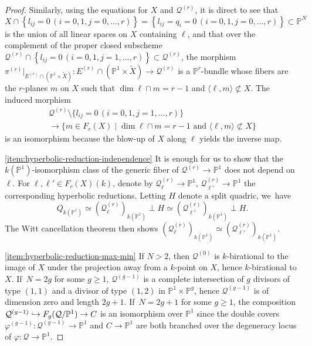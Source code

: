 \documentclass[JEP,XML,SOM,Unicode,NoEqCountersInSection,published]{cedram}
\newcommand\hto{\mathrel{\lhook\joinrel\to}}
\theoremstyle{plain}
\theoremstyle{definition}
\let\phi\varphi
\renewcommand\P{\mathbb{P}}
\begin{document}
\begin{proof}
Similarly, using the equations for $X$ and $\mathcal{Q}^{(r)}$,
it is direct to see that
\[
X\cap \left\{l_{ij}=0\, (i=0,1, j=0,\dots, r)\right\}=\left\{l_{ij}=q_i = 0 \, (i=0,1, j=0,\dots, r)\right\}\subset \P^N
\]
is the union of all linear spaces on $X$ containing $\ell$,
and that
over the complement of the proper closed subscheme $\mathcal{Q}^{(r)}\cap\left\{l_{ij} = 0 \, (i= 0,1, j=1,\dots, r)\right\}\subset \mathcal{Q}^{(r)}$, the morphism $\pi^{(r)}|_{E^{(r)}\cap (\P^1\times \widetilde{X})}\colon E^{(r)}\cap (\P^1\times \widetilde{X})\to \mathcal{Q}^{(r)}$ is
a $\P^{r}$-bundle whose fibers are the $r$-planes $m$ on $X$ such that $\dim \ell\cap m = r-1$ and $\langle \ell, m\rangle \not\subset X$.
The induced morphism
\begin{multline*}
\mathcal{Q}^{(r)}\setminus\bigl\{l_{ij} = 0 \, (i= 0,1, j=1,\dots, r)\bigr\}\\
\to\bigl\{m\in F_r(X)\mid \dim \ell\cap m = r-1 \text{ and }\langle \ell,m\rangle \not\subset X\bigr\}
\end{multline*}
is an isomorphism because the blow-up of $X$ along $\ell$ yields the inverse map.

\eqref{item:hyperbolic-reduction-independence}
It is enough for us to show that the $k(\P^1)$-isomorphism class of the generic fiber of $\mathcal{Q}^{(r)}\to \P^1$ does not depend on $\ell$.
For $\ell, \ell'\in F_r(X)(k)$, denote by $\mathcal{Q}^{(r)}_\ell\to \P^1$, $\mathcal{Q}^{(r)}_{\ell'}\to \P^1$
the corresponding hyperbolic reductions. Letting $H$ denote a split quadric, we~have
\[
Q_{k(\P^1)}\simeq (\mathcal{Q}^{(r)}_{\ell})_{k(\P^1)}\perp H \simeq (\mathcal{Q}^{(r)}_{\ell'})_{k(\P^1)}\perp H.
\]
The Witt cancellation theorem \cite[Th.\,8.4]{EKM-quadratic-forms}
then shows $(\mathcal{Q}^{(r)}_\ell)_{k(\P^1)}\simeq (\mathcal{Q}^{(r)}_{\ell'})_{k(\P^1)}$.

\eqref{item:hyperbolic-reduction-max-min}
If $N>2$, then $\mathcal{Q}^{(0)}$ is $k$\nobreakdash-birational to the image of $X$ under the projection away from a $k$\nobreakdash-point on $X$, hence $k$\nobreakdash-birational to $X$. If~$N=2g$ for some $g\geq 1$, $\mathcal{Q}^{(g-1)}$ is a complete intersection of $g$ divisors of type $(1,1)$ and a divisor of type $(1,2)$ in $\P^1\times \P^{g}$, hence $\mathcal{Q}^{(g-1)}$ is of dimension zero and length $2g+1$. If~$N=2g+1$ for some $g\geq 1$,
the composition $\mathcal{Q}^{(g-1)}\hto F_{g}(\mathcal{Q}/\P^1)\to C$ is an isomorphism over \(\P^1\)
since the double covers $\phi^{(g-1)}\colon\mathcal{Q}^{(g-1)}\to \P^1$ and $C\to \P^1$ are both branched over the degeneracy locus of $\phi\colon \mathcal{Q}\to \P^1$.


\end{proof}
\end{document}
